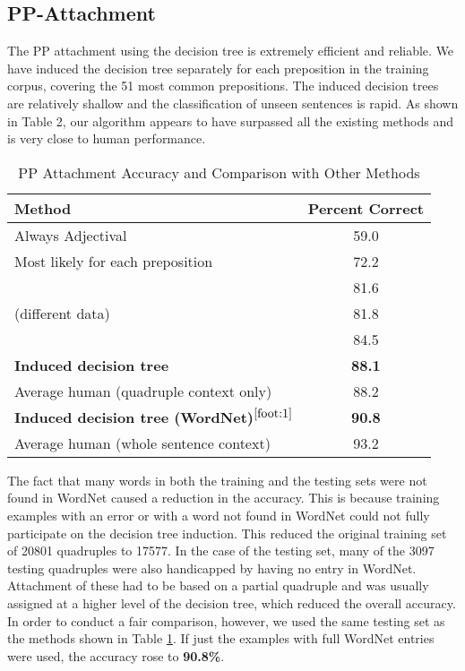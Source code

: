 \subsection{PP-Attachment}

The PP attachment using the decision tree is extremely efficient and reliable. We have induced the decision tree separately for each preposition in the training corpus, covering the 51 most common prepositions. The induced decision trees are relatively shallow and the classification of unseen sentences is rapid. As shown in Table 2, our algorithm appears to have surpassed all the existing methods and is very close to human performance. 
\addtocounter{footnote}{1}

\begin{table}[t]
  \leavevmode
    \caption{PP Attachment Accuracy and Comparison with Other Methods}
    \label{tab:2}
  \begin{center}
\begin{tabular}[c]{|l|c|}\hline
{\bf Method }& {\bf Percent Correct}\\\hline
Always Adjectival & 59.0 \\\hline
Most likely for each preposition & 72.2\\\hline
\cite{RRR94} & 81.6\\\hline
\cite{BandR94} (different data) & 81.8\\\hline
\cite{CandB95} & 84.5\\\hline
{\bf Induced decision tree} & {\bf 88.1}\\\hline
Average human (quadruple context only) & 88.2\\\hline
{\bf Induced decision tree (WordNet)}$^{\ref{foot:1}}$
 & {\bf 90.8}\\\hline
Average human (whole sentence context) & 93.2\\\hline
\end{tabular}
\end{center}
\end{table}


The fact that many words in both the training and the testing sets were not found in WordNet caused a reduction in the accuracy. This is because training examples with an error or with a word not found in WordNet could not fully participate on the decision tree induction. This reduced the original training set of 20801 quadruples to 17577. In the case of the testing set, many of the 3097 testing quadruples were also handicapped by having no entry in WordNet. Attachment of these had to be based on a partial quadruple and was usually assigned at a higher level of the decision tree, which reduced the overall accuracy. In order to conduct a fair comparison, however, we used the same testing set as the methods shown in Table \ref{tab:2}. If just the examples with full WordNet entries were used, the accuracy rose to {\bf 90.8\%}. 

